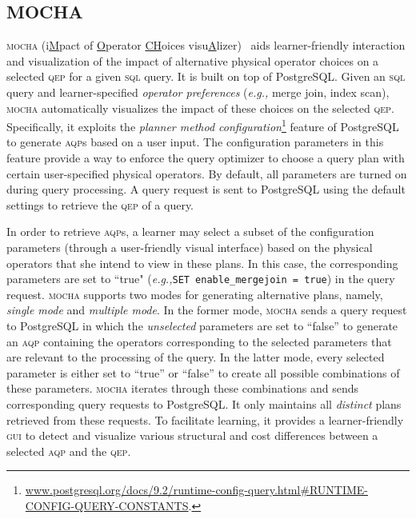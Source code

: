 \documentclass[11pt]{article}
\newcommand{\eg}{\emph{e.g.,}\xspace}
\begin{document}
\subsection{MOCHA} %
\textsc{mocha} (i\underline{M}pact of \underline{O}perator \underline{CH}oices visu\underline{A}lizer)~\cite{mocha, mocha-soft} aids learner-friendly interaction and visualization of the impact of alternative physical operator choices on a selected \textsc{qep} for a given \textsc{sql} query. It is built on top of PostgreSQL. Given  an \textsc{sql} query and learner-specified \textit{operator preferences} (\eg merge join, index scan), \textsc{mocha} automatically visualizes the impact of these choices on the selected \textsc{qep}.
Specifically, it exploits the \textit{planner method configuration}\footnote{\scriptsize \url{www.postgresql.org/docs/9.2/runtime-config-query.html\#RUNTIME-CONFIG-QUERY-CONSTANTS}.} feature of PostgreSQL to generate \textsc{aqp}s based on a user input. The configuration parameters in this feature provide a way to enforce the query optimizer to choose a query plan with certain user-specified physical operators. By default, all parameters are turned on during query processing. A query request is sent to PostgreSQL using the default settings to retrieve the \textsc{qep} of a query. 

In order to retrieve \textsc{aqp}s, a learner may select a subset of the configuration parameters (through a user-friendly visual interface) based on the physical operators that she intend to view in these plans. In this case, the corresponding parameters are set to \textsf{``true"} (\eg \texttt{SET enable\_mergejoin = \textsf{true}}) in the query request. \textsc{mocha} supports two modes for generating alternative plans, namely, \textit{single mode} and \textit{multiple mode}.  In the former mode, \textsc{mocha} sends a query request to PostgreSQL in which the \emph{unselected} parameters are set to \textsf{``false''} to generate an \textsc{aqp} containing the operators corresponding to the selected parameters that are relevant to the processing of the query. In the latter mode, every selected parameter is either set to \textsf{``true''} or \textsf{``false''} to create all possible combinations of these parameters. \textsc{mocha} iterates through these combinations and sends corresponding query requests to PostgreSQL. It only maintains all \emph{distinct} plans retrieved from these requests. To facilitate learning, it provides a learner-friendly \textsc{gui} to detect and visualize various structural and cost differences between a selected \textsc{aqp} and the \textsc{qep}. 
\end{document}
